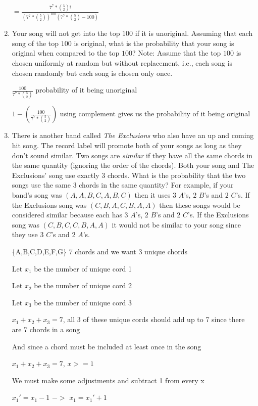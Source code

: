 \documentclass[12pt]{article}
\newcounter{ques}
\newenvironment{question}{\stepcounter{ques}{\noindent\bf Question \arabic{ques}:}}{\vspace{5mm}}
\begin{document}
\begin{question}
\begin{enumerate}
		$= \frac{7^7 * {5 \choose 2}!}{(7^7 * {5 \choose 2})^{100}(7^7 * {5 \choose 2}-100)}$

		\item Your song will not get into the top $100$ if it is unoriginal. Assuming  that each song of the top $100$ is original, what is the probability that your song is original when compared to the top $100$? Note: Assume that the top $100$ is chosen uniformly at random but without replacement, i.e., each song is chosen randomly but each song is chosen only once.
		
		$\frac{100}{7^7 * {5 \choose 2}}$ probability of it being unoriginal

		$1-(\frac{100}{7^7 * {5 \choose 2}})$ using complement gives us the probability of it being original
		
		\item There is another band called \emph{The Exclusions} who also have an up and coming hit song. The record label will promote both of your songs as long as they don't sound similar. Two songs are \emph{similar} if they have all the same chords in the same quantity (ignoring the order of the chords). Both your song and The Exclusions' song use exactly $3$ chords. What is the probability that the two songs use the same $3$ chords in the same quantity? For example, if your band's song was  $(A,A,B,C,A,B,C)$ then it uses $3$ $A$'s, $2$ $B$'s and $2$ $C$'s. If the Exclusions song was $(C,B,A,C,B,A,A)$ then these songs would be considered similar because each has $3$ $A$'s, $2$ $B$'s and $2$ $C$'s. If the Exclusions song was $(C,B,C,C,B,A,A)$ it would not be similar to your song since they use $3$ $C$'s and $2$ $A$'s. 
		
		\{A,B,C,D,E,F,G\} 7 chords and we want 3 unique chords

		Let $x_1$ be the number of unique cord 1
		
		Let $x_2$ be the number of unique cord 2

		Let $x_3$ be the number of unique cord 3

		$x_1 + x_2 + x_3 = 7$, all 3 of these unique cords should add up to 7 since there are 7 chords in a song
	
		And since a chord must be included at least once in the song 

		$x_1 + x_2 + x_3 = 7$, $x >= 1$ 

		We must make some adjustments and subtract 1 from every x

		$x_1' = x_1 - 1$ $->$ $x_1 = x_1' + 1$


\end{enumerate}
\end{question}
\end{document}
